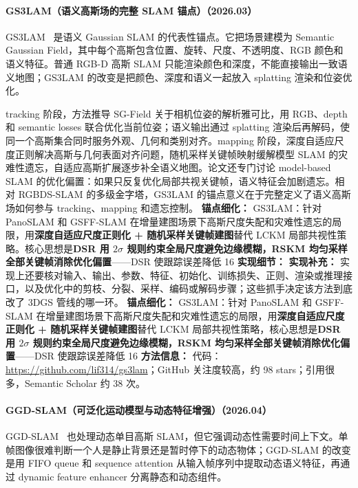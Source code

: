 \paragraph{GS3LAM（语义高斯场的完整 SLAM 锚点）（2026.03）}
GS3LAM~\cite{2603_27781} 是语义 Gaussian SLAM 的代表性锚点。它把场景建模为 Semantic Gaussian Field，其中每个高斯包含位置、旋转、尺度、不透明度、RGB 颜色和语义特征。普通 RGB-D 高斯 SLAM 只能渲染颜色和深度，不能直接输出一致语义地图；GS3LAM 的改变是把颜色、深度和语义一起放入 splatting 渲染和位姿优化。

tracking 阶段，方法推导 SG-Field 关于相机位姿的解析雅可比，用 RGB、depth 和 semantic losses 联合优化当前位姿；语义输出通过 splatting 渲染后再解码，使同一个高斯集合同时服务外观、几何和类别对齐。mapping 阶段，深度自适应尺度正则解决高斯与几何表面对齐问题，随机采样关键帧映射缓解模型 SLAM 的灾难性遗忘，自适应高斯扩展逐步补全语义地图。论文还专门讨论 model-based SLAM 的优化偏置：如果只反复优化局部共视关键帧，语义特征会加剧遗忘。相对 RGBDS-SLAM 的多级金字塔，GS3LAM 的锚点意义在于完整定义了语义高斯场如何参与 tracking、mapping 和遗忘控制。
\textbf{锚点细化：} GS3LAM：针对 PanoSLAM 和 GSFF-SLAM 在增量建图场景下高斯尺度失配和灾难性遗忘的局限，用\textbf{深度自适应尺度正则化 + 随机采样关键帧建图}替代 LCKM 局部共视性策略。核心思想是\textbf{DSR 用 $2\sigma$ 规则约束全局尺度避免边缘模糊，RSKM 均匀采样全部关键帧消除优化偏置}——DSR 使跟踪误差降低 16
\textbf{实现细节：}
\textbf{实现补充：} 实现上还要核对输入、输出、参数、特征、初始化、训练损失、正则、渲染或推理接口，以及优化中的剪枝、分裂、采样、编码或解码步骤；这些抓手决定该方法到底改了 3DGS 管线的哪一环。
\textbf{锚点细化：} GS3LAM：针对 PanoSLAM 和 GSFF-SLAM 在增量建图场景下高斯尺度失配和灾难性遗忘的局限，用\textbf{深度自适应尺度正则化 + 随机采样关键帧建图}替代 LCKM 局部共视性策略，核心思想是\textbf{DSR 用 $2\sigma$ 规则约束全局尺度避免边缘模糊，RSKM 均匀采样全部关键帧消除优化偏置}——DSR 使跟踪误差降低 16%
\textbf{方法信息：} 代码：\url{https://github.com/lif314/gs3lam}；GitHub 关注度较高，约 98 stars；引用很多，Semantic Scholar 约 38 次。



\paragraph{GGD-SLAM（可泛化运动模型与动态特征增强）（2026.04）}
GGD-SLAM~\cite{2604_12837} 也处理动态单目高斯 SLAM，但它强调动态性需要时间上下文。单帧图像很难判断一个人是静止背景还是暂时停下的动态物体；GGD-SLAM 的改变是用 FIFO queue 和 sequence attention 从输入帧序列中提取动态语义特征，再通过 dynamic feature enhancer 分离静态和动态组件。

